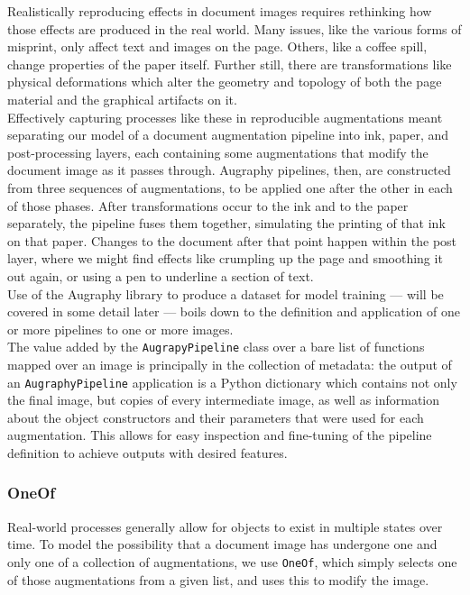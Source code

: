 \documentclass[runningheads]{llncs}
\begin{document}
Realistically reproducing effects in document images requires rethinking how those effects are produced in the real world. Many issues, like the various forms of misprint, only affect text and images on the page. Others, like a coffee spill, change properties of the paper itself. Further still, there are transformations like physical deformations which alter the geometry and topology of both the page material and the graphical artifacts on it.\\

Effectively capturing processes like these in reproducible augmentations meant separating our model of a document augmentation pipeline into ink, paper, and post-processing layers, each containing some augmentations that modify the document image as it passes through. Augraphy pipelines, then, are constructed from three sequences of augmentations, to be applied one after the other in each of those phases. After transformations occur to the ink and to the paper separately, the pipeline fuses them together, simulating the printing of that ink on that paper. Changes to the document after that point happen within the post layer, where we might find effects like crumpling up the page and smoothing it out again, or using a pen to underline a section of text.\\

Use of the Augraphy library to produce a dataset for model training — will be covered in some detail later — boils down to the definition and application of one or more pipelines to one or more images.\\

The value added by the \texttt{AugrapyPipeline} class over a bare list of functions mapped over an image is principally in the collection of metadata: the output of an \texttt{AugraphyPipeline} application is a Python dictionary which contains not only the final image, but copies of every intermediate image, as well as information about the object constructors and their parameters that were used for each augmentation. This allows for easy inspection and fine-tuning of the pipeline definition to achieve outputs with desired features.

\subsubsection{OneOf}
Real-world processes generally allow for objects to exist in multiple states over time. To model the possibility that a document image has undergone one and only one of a collection of augmentations, we use \texttt{OneOf}, which simply selects one of those augmentations from a given list, and uses this to modify the image.
\end{document}
